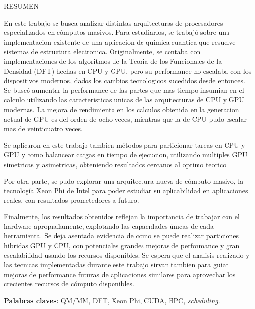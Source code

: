 \begin{center}
\large \textsc{RESUMEN}
\end{center}
\vspace{1cm}

\noindent

En este trabajo se busca analizar distintas arquitecturas de procesadores especializados
en c\'omputos masivos. Para estudiarlos, se trabaj\'o sobre una implementacion existente
de una aplicacion de quimica cuantica que resuelve sistemas de estructura electronica.
Originalmente, se contaba con implementaciones de los algoritmos de la Teoria de los
Funcionales de la Densidad (DFT) hechas en CPU y GPU, pero su performance no escalaba con los
dispositivos modernos, dados los cambios tecnologicos sucedidos desde entonces. Se busc\'o
aumentar la performance de las partes que mas tiempo insumian en el calculo utilizando
las caracteristicas unicas de las arquitecturas de CPU y GPU modernas. La mejora de
rendimiento en los calculos obtenida en la generacion actual de GPU es del orden de ocho
veces, mientras que la de CPU pudo escalar mas de veinticuatro veces.

Se aplicaron en este trabajo tambien m\'etodos para particionar tareas en CPU y GPU y como
balancear cargas en tiempo de ejecucion, utilizando multiples GPU simetricas y asimetricas,
obteniendo resultados cercanos al optimo teorico.

Por otra parte, se pudo explorar una arquitectura nueva de c\'omputo masivo, la
tecnolog\'ia Xeon Phi de Intel para poder estudiar su aplicabilidad en aplicaciones reales, con
resultados prometedores a futuro.

Finalmente, los resultados obtenidos reflejan la importancia de trabajar con el hardware
apropiadamente, explotando las capacidades \'unicas de cada herramienta. Se deja asentada evidencia
de como se puede realizar particiones hibridas GPU y CPU, con potenciales grandes mejoras
de performance y gran escalabilidad usando los recursos disponibles. Se espera que el analisis
realizado y las tecnicas implementadas durante este trabajo sirvan tambien para guiar mejoras
de performance futuras de aplicaciones similares para aprovechar los crecientes recursos de c\'omputo
disponibles.

\bigskip

\noindent\textbf{Palabras claves:} QM/MM, DFT, Xeon Phi, CUDA, HPC, \textit{scheduling}.
